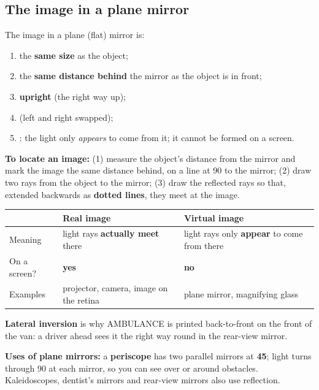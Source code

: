 \documentclass[11pt]{article}
\begin{document}
\subsection*{The image in a plane mirror}
\begin{minipage}[t]{0.5\textwidth}
\vspace{0pt}
The image in a plane (flat) mirror is:
\begin{enumerate}
\item the \textbf{same size} as the object;
\item the \textbf{same distance behind} the mirror as the object is in front;
\item \textbf{upright} (the right way up);
\item \textbf{\tLatInv} (left and right swapped);
\item \textbf{\tVirtual}: the light only \emph{appears} to come from it; it cannot be formed on a screen.
\end{enumerate}
\textbf{To locate an image:} (1) measure the object's distance from the mirror and mark the image the same distance behind, on a line at 90\textdegree{} to the mirror; (2) draw two rays from the object to the mirror; (3) draw the reflected rays so that, extended backwards as \textbf{dotted lines}, they meet at the image.
\end{minipage}\hfill
\begin{minipage}[t]{0.46\textwidth}
\vspace{2pt}\centering
\FigPlaneImage[5mm]
\end{minipage}

\begin{tabularx}{\textwidth}{@{}l X X@{}}
\toprule
& \textbf{Real image} & \textbf{Virtual image}\\
\midrule
Meaning & light rays \textbf{actually meet} there & light rays only \textbf{appear} to come from there\\
On a screen? & \textbf{yes} & \textbf{no}\\
Examples & projector, camera, image on the retina & plane mirror, magnifying glass\\
\bottomrule
\end{tabularx}

\medskip
\begin{minipage}[t]{0.6\textwidth}
\vspace{0pt}
\textbf{Lateral inversion} is why AMBULANCE is printed back-to-front on the front of the van: a driver ahead sees it the right way round in the rear-view mirror.
\begin{center}\FigLatInv\end{center}
\textbf{Uses of plane mirrors:} a \textbf{periscope} has two parallel mirrors at \textbf{45\textdegree}; light turns through 90\textdegree{} at each mirror, so you can see over or around obstacles. Kaleidoscopes, dentist's mirrors and rear-view mirrors also use reflection.
\end{minipage}\hfill
\begin{minipage}[t]{0.35\textwidth}
\vspace{0pt}\centering
{}
\end{minipage}
\end{document}
